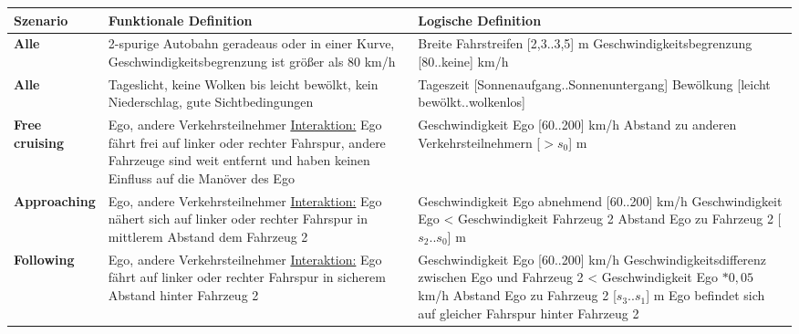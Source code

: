 \small
\begin{longtable}[c]{p{2cm} p{5.5cm} p{6cm}}
\textbf{Szenario} & \textbf{Funktionale Definition} & \textbf{Logische Definition} \\
\hline
\endhead

\textbf{Alle} & 2-spurige Autobahn geradeaus oder in einer Kurve, Geschwindigkeitsbegrenzung ist größer als 80 km/h & Breite Fahrstreifen [2,3..3,5] m \newline Geschwindigkeitsbegrenzung [80..keine] km/h \\
\hline

\textbf{Alle} & Tageslicht, keine Wolken bis leicht bewölkt, kein Niederschlag, gute Sichtbedingungen & Tageszeit [Sonnenaufgang..Sonnenuntergang] \newline Bewölkung [leicht bewölkt..wolkenlos]\\
\hline \hline

\textbf{Free cruising} & Ego, andere Verkehrsteilnehmer \newline \underline{Interaktion:} Ego fährt frei auf linker oder rechter Fahrspur, andere Fahrzeuge sind weit entfernt und haben keinen Einfluss auf die Manöver des Ego & Geschwindigkeit Ego [60..200] km/h \newline Abstand zu anderen Verkehrsteilnehmern [$>s_0$] m \\
\hline

\textbf{Approaching} & Ego, andere Verkehrsteilnehmer \newline \underline{Interaktion:} Ego nähert sich auf linker oder rechter Fahrspur in mittlerem Abstand dem Fahrzeug 2 & Geschwindigkeit Ego abnehmend [60..200] km/h \newline Geschwindigkeit Ego < Geschwindigkeit Fahrzeug 2 \newline Abstand Ego zu Fahrzeug 2 [$s_2$..$s_0$] m \\
\hline

\textbf{Following} & Ego, andere Verkehrsteilnehmer \newline \underline{Interaktion:} Ego fährt auf linker oder rechter Fahrspur in sicherem Abstand hinter Fahrzeug 2 & Geschwindigkeit Ego [60..200] km/h \newline Geschwindigkeitsdifferenz zwischen Ego und Fahrzeug 2 < Geschwindigkeit Ego $*0,05$ km/h \newline Abstand Ego zu Fahrzeug 2 [$s_3$..$s_1$] m \newline Ego befindet sich auf gleicher Fahrspur hinter Fahrzeug 2 \\
\hline


\end{longtable}

